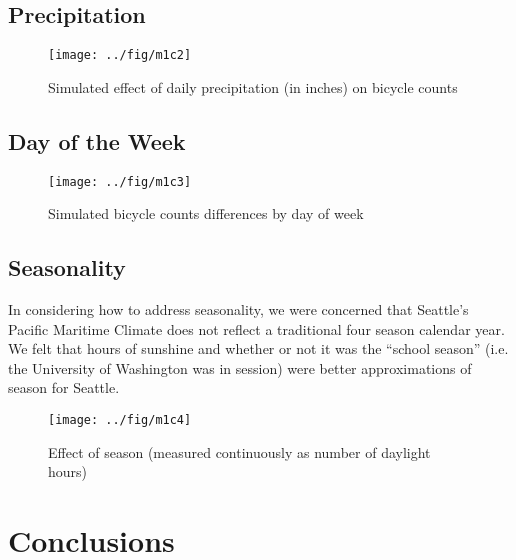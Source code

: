 \documentclass[final]{beamer}
\begin{document}
\begin{frame}[t]
\begin{multicols}{3}
\subsection{Precipitation}

\begin{figure}[htbp]
\begin{center}
\texttt{[image: ../fig/m1c2]}
\caption{Simulated effect of daily precipitation (in inches) on bicycle counts}
\label{fg:maxtemp}
\end{center}
\end{figure}

\subsection{Day of the Week}

\begin{figure}[htbp]
\begin{center}
\texttt{[image: ../fig/m1c3]}
\caption{Simulated bicycle counts differences by day of week}
\label{fg:dow}
\end{center}
\end{figure}

\subsection{Seasonality}
In considering how to address seasonality, we were concerned that
Seattle's Pacific Maritime Climate does not reflect a traditional four
season calendar year. We felt that hours of sunshine and whether or
not it was the ``school season'' (i.e. the University of Washington
was in session) were better approximations of season for Seattle.

\begin{figure}[htbp]
\begin{center}
\texttt{[image: ../fig/m1c4]}
\caption{Effect of season (measured continuously as number of daylight hours)}
\label{default}
\end{center}
\end{figure}


\section{Conclusions}


\end{multicols}
\end{frame}
\end{document}
